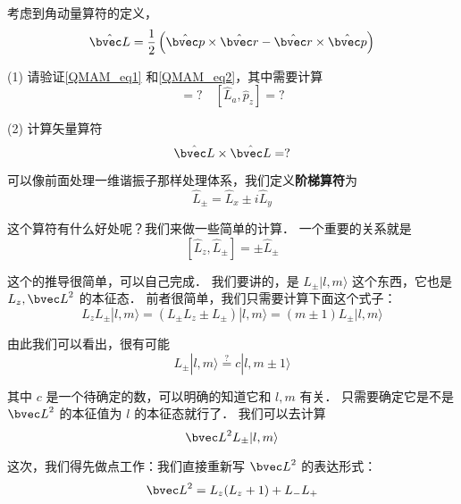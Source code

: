 \begin{exercise}{}
考虑到角动量算符的定义，
\begin{equation}
{\hat{\bvec L}} = \displaystyle\frac{1}{2}\left({\hat{\bvec p}}\times {\hat{\bvec r}} - {\hat{\bvec r}}\times {\hat{\bvec p}}\right)
\end{equation}

(1) 请验证\autoref{QMAM_eq1} 和\autoref{QMAM_eq2}，其中需要计算
\begin{equation}
[\hat L_a, \hat r_b] = ? \quad [\hat L_a, \hat p_z] = ? 
\end{equation}

(2) 计算矢量算符
\begin{equation}
\hat{\bvec L}\times \hat{\bvec L} = ?
\end{equation}
\end{exercise}

可以像前面处理一维谐振子那样处理体系，我们定义\textbf{阶梯算符}为
\begin{equation}
\hat L_{\pm} = \hat L_x \pm i\hat L_y
\end{equation}

这个算符有什么好处呢？我们来做一些简单的计算． 一个重要的关系就是
\begin{equation}\label{QMAM_eq10}
[\hat L_z, \hat L_{\pm}] = \pm \hat L_{\pm}
\end{equation}

这个的推导很简单，可以自己完成． 我们要讲的，是 $L_{\pm}|l,m\rangle$ 这个东西，它也是 $L_z, {\bvec L}^2$ 的本征态． 前者很简单，我们只需要计算下面这个式子：
\begin{equation}
L_z L_{\pm}|l,m\rangle = (L_{\pm}L_z \pm L_{\pm})|l,m\rangle = (m\pm 1)L_{\pm}|l,m\rangle
\end{equation}

由此我们可以看出，很有可能
\begin{equation}
L_{\pm}|l,m\rangle \overset{?}{=} c|l,m\pm1\rangle
\end{equation}

其中 $c$ 是一个待确定的数，可以明确的知道它和 $l,m$ 有关． 只需要确定它是不是 ${\bvec L}^2$ 的本征值为 $l$ 的本征态就行了． 我们可以去计算
\begin{equation}
{\bvec L}^2L_{\pm}|l,m\rangle
\end{equation}

这次，我们得先做点工作：我们直接重新写 ${\bvec L}^2$ 的表达形式：
\begin{equation}
{\bvec L}^2 = L_z(L_z+1)+L_-L_+
\end{equation}


